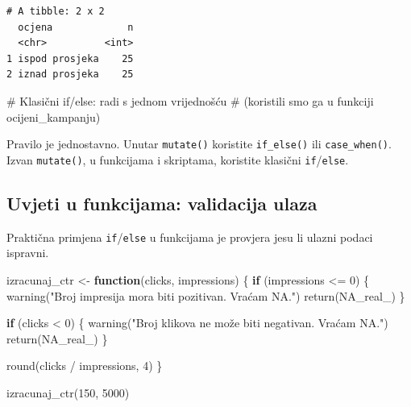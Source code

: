 \documentclass[
  croatian,
  letterpaper,
  DIV=11,
  numbers=noendperiod]{scrartcl}
\newenvironment{Shaded}{\begin{snugshade}}{\end{snugshade}}
\newcommand{\CommentTok}[1]{\textcolor[rgb]{0.37,0.37,0.37}{#1}}
\newcommand{\ConstantTok}[1]{\textcolor[rgb]{0.56,0.35,0.01}{#1}}
\newcommand{\ControlFlowTok}[1]{\textcolor[rgb]{0.00,0.23,0.31}{\textbf{#1}}}
\newcommand{\DecValTok}[1]{\textcolor[rgb]{0.68,0.00,0.00}{#1}}
\newcommand{\FunctionTok}[1]{\textcolor[rgb]{0.28,0.35,0.67}{#1}}
\newcommand{\NormalTok}[1]{\textcolor[rgb]{0.00,0.23,0.31}{#1}}
\newcommand{\OtherTok}[1]{\textcolor[rgb]{0.00,0.23,0.31}{#1}}
\newcommand{\SpecialCharTok}[1]{\textcolor[rgb]{0.37,0.37,0.37}{#1}}
\newcommand{\StringTok}[1]{\textcolor[rgb]{0.13,0.47,0.30}{#1}}
\begin{document}
\begin{verbatim}
# A tibble: 2 x 2
  ocjena             n
  <chr>          <int>
1 ispod prosjeka    25
2 iznad prosjeka    25
\end{verbatim}

\begin{Shaded}
\begin{Highlighting}[]
\CommentTok{\# Klasični if/else: radi s jednom vrijednošću}
\CommentTok{\# (koristili smo ga u funkciji ocijeni\_kampanju)}
\end{Highlighting}
\end{Shaded}

Pravilo je jednostavno. Unutar \texttt{mutate()} koristite
\texttt{if\_else()} ili \texttt{case\_when()}. Izvan \texttt{mutate()},
u funkcijama i skriptama, koristite klasični \texttt{if}/\texttt{else}.

\subsection{Uvjeti u funkcijama: validacija
ulaza}\label{uvjeti-u-funkcijama-validacija-ulaza}

Praktična primjena \texttt{if}/\texttt{else} u funkcijama je provjera
jesu li ulazni podaci ispravni.

\begin{Shaded}
\begin{Highlighting}[]
\NormalTok{izracunaj\_ctr }\OtherTok{\textless{}{-}} \ControlFlowTok{function}\NormalTok{(clicks, impressions) \{}
  \ControlFlowTok{if}\NormalTok{ (impressions }\SpecialCharTok{\textless{}=} \DecValTok{0}\NormalTok{) \{}
    \FunctionTok{warning}\NormalTok{(}\StringTok{"Broj impresija mora biti pozitivan. Vraćam NA."}\NormalTok{)}
    \FunctionTok{return}\NormalTok{(}\ConstantTok{NA\_real\_}\NormalTok{)}
\NormalTok{  \}}
  
  \ControlFlowTok{if}\NormalTok{ (clicks }\SpecialCharTok{\textless{}} \DecValTok{0}\NormalTok{) \{}
    \FunctionTok{warning}\NormalTok{(}\StringTok{"Broj klikova ne može biti negativan. Vraćam NA."}\NormalTok{)}
    \FunctionTok{return}\NormalTok{(}\ConstantTok{NA\_real\_}\NormalTok{)}
\NormalTok{  \}}
  
  \FunctionTok{round}\NormalTok{(clicks }\SpecialCharTok{/}\NormalTok{ impressions, }\DecValTok{4}\NormalTok{)}
\NormalTok{\}}

\FunctionTok{izracunaj\_ctr}\NormalTok{(}\DecValTok{150}\NormalTok{, }\DecValTok{5000}\NormalTok{)}
\end{Highlighting}
\end{Shaded}
\end{document}
